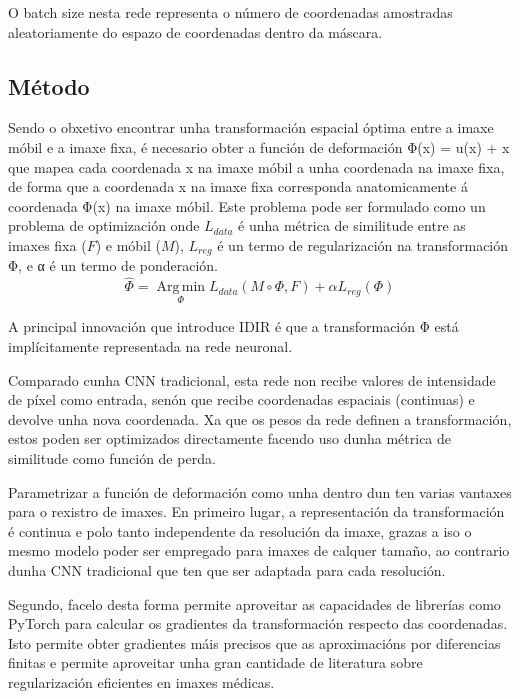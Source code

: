 O batch size nesta rede representa o número de coordenadas amostradas aleatoriamente do espazo de coordenadas dentro da máscara.

\subsection{Método}
\label{subsubsec:Método}

Sendo o obxetivo encontrar unha transformación espacial óptima entre a imaxe móbil e a imaxe fixa,
é necesario obter a función de deformación  Φ(x) = u(x) + x que mapea cada coordenada x na imaxe móbil a unha coordenada na imaxe fixa, 
de forma que a coordenada x na imaxe fixa corresponda anatomicamente á coordenada Φ(x) na imaxe móbil.
Este problema pode ser formulado como un problema de optimización onde $L_{data}$ é unha métrica de similitude entre as imaxes fixa ($F$) e móbil ($M$), $L_{reg}$ é un termo de regularización na transformación Φ, e α é un termo de ponderación.
\begin{equation}
    \hat{\Phi} = \operatorname*{Arg\,min}_{\Phi} L_{data}(M \circ \Phi, F) + \alpha L_{reg}(\Phi)
\end{equation}


A principal innovación que introduce IDIR\cite{wolterink2021implicit} é que a transformación Φ está implícitamente representada na rede neuronal.

Comparado cunha CNN tradicional, esta rede non recibe valores de intensidade de píxel como entrada,
senón que recibe coordenadas espaciais (continuas) e devolve unha nova coordenada.
Xa que os pesos da rede definen a transformación, estos poden ser optimizados directamente 
facendo uso dunha métrica de similitude como función de perda.

Parametrizar a función de deformación como unha  dentro dun  ten varias vantaxes para o rexistro de imaxes.
En primeiro lugar, a representación da transformación é continua e polo tanto independente da resolución da imaxe, 
grazas a iso o mesmo modelo poder ser empregado para imaxes de calquer tamaño, ao contrario dunha CNN tradicional 
que ten que ser adaptada para cada resolución.

Segundo, facelo desta forma permite aproveitar as capacidades de librerías como PyTorch para calcular os gradientes da transformación respecto das coordenadas.
Isto permite obter gradientes máis precisos que as aproximacións por diferencias finitas 
e permite aproveitar unha gran cantidade de literatura sobre regularización eficientes en imaxes médicas.

